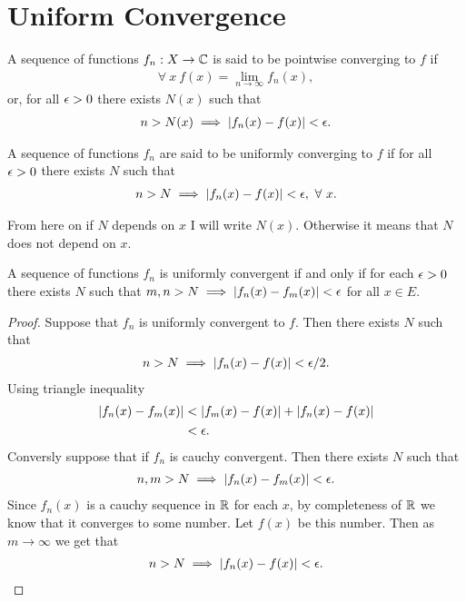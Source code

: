 \section{Uniform Convergence}
\begin{definition}
  A sequence of functions $f_n:X\to \mathbb{C}$ is said to be pointwise converging to $f$ if
  \begin{align*}
    \forall\ x\ f(x) = \lim_{n\to \infty} f_n(x),
  \end{align*}
  or, for all $\epsilon>0$ there exists $N(x)$ such that
  \begin{align*}
    n>N(x) \implies |f_n(x) - f(x)| < \epsilon.
  \end{align*}
\end{definition}
\begin{definition}
  A sequence of functions $f_n$ are said to be uniformly converging to $f$ if for all $\epsilon>0$ there exists $N$ such that
  \begin{align*}
    n>N \implies |f_n(x)-f(x)| < \epsilon,\ \forall\ x.
  \end{align*}
\end{definition}
\begin{remark}
  From here on if $N$ depends on $x$ I will write $N(x)$. Otherwise it means that $N$ does not depend on $x$.
\end{remark}
\begin{proposition}
  A sequence of functions $f_n$ is uniformly convergent if and only if for each $\epsilon>0$ there exists $N$ such that $m,n>N \implies |f_n(x) - f_m(x)|< \epsilon$ for all $x\in E$.
\end{proposition}
\begin{proof}
  Suppose that $f_n$ is uniformly convergent to $f$. Then there exists $N$ such that
  \begin{align*}
    n>N \implies |f_n(x) - f(x)| < \epsilon/2.
  \end{align*}
  Using triangle inequality
  \begin{align*}
    |f_n(x) - f_m(x)| &< |f_m(x) - f(x)| + |f_n(x) - f(x)|\\ 
                      &< \epsilon.
  \end{align*}
  Conversly suppose that if $f_n$ is cauchy convergent. Then there exists $N$ such that
  \begin{align*}
    n,m>N \implies |f_n(x) - f_m(x)| <\epsilon.
  \end{align*}
  Since $f_n(x)$ is a cauchy sequence in $\mathbb{R}$ for each $x$, by completeness of $\mathbb{R}$ we know that it converges to some number. Let $f(x)$ be this number. Then as $m\to \infty$ we get that
  \begin{align*}
    n>N \implies |f_n(x) - f(x)| < \epsilon.
  \end{align*}
\end{proof}
